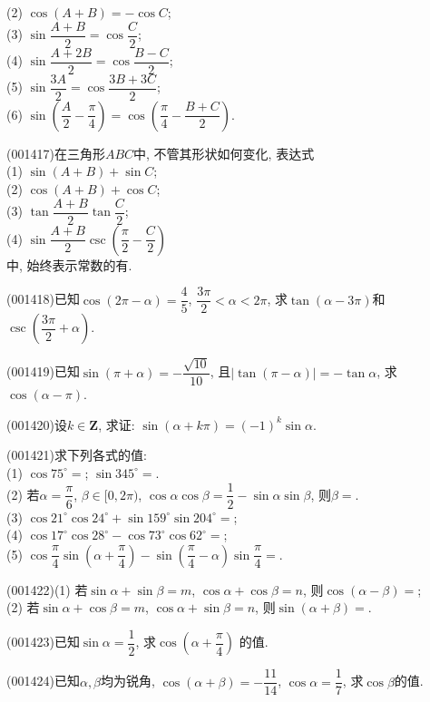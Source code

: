 (2) $\cos(A+B)=-\cos C$;\\ 
(3) $\sin\dfrac{A+B}{2}=\cos\dfrac{C}{2}$;\\ 
(4) $\sin\dfrac{A+2B}{2}=\cos\dfrac{B-C}{2}$;\\ 
(5) $\sin\dfrac{3A}{2}=\cos\dfrac{3B+3C}{2}$;\\ 
(6) $\sin\left(\dfrac{A}{2}-\dfrac{\pi}{4}\right)=\cos\left(\dfrac{\pi}4-\dfrac{B+C}{2}\right)$.
\item (001417)在三角形$ABC$中, 不管其形状如何变化, 表达式\\ 
(1) $\sin(A+B)+\sin C$;\\ 
(2) $\cos(A+B)+\cos C$;\\ 
(3) $\tan\dfrac{A+B}{2}\tan\dfrac{C}{2}$;\\ 
(4) $\sin\dfrac{A+B}{2}\csc\left(\dfrac{\pi}{2}-\dfrac{C}{2}\right)$\\ 
中, 始终表示常数的有.
\item (001418)已知$\cos(2\pi-\alpha)=\dfrac{4}{5}$, $\dfrac{3\pi}{2}<\alpha<2\pi$, 求$\tan(\alpha-3\pi)$和$\csc\left(\dfrac{3\pi}{2}+\alpha\right)$.
\item (001419)已知$\sin(\pi+\alpha)=-\dfrac{\sqrt{10}}{10}$, 且$|\tan(\pi-\alpha)|=-\tan\alpha$, 求$\cos(\alpha-\pi)$.
\item (001420)设$k\in\mathbf{Z}$, 求证: $\sin(\alpha+k\pi)=(-1)^k\sin\alpha$.
\item (001421)求下列各式的值:\\ 
(1) $\cos 75^\circ=$; $\sin 345^\circ=$.\\ 
(2) 若$\alpha=\dfrac{\pi}{6}$, $\beta\in [0,2\pi)$, $\cos\alpha\cos\beta=\dfrac{1}{2}-\sin\alpha\sin\beta$, 则$\beta=$.\\ 
(3) $\cos 21^\circ\cos 24^\circ+\sin 159^\circ\sin 204^\circ=$;\\ 
(4) $\cos 17^\circ\cos 28^\circ-\cos 73^\circ\cos 62^\circ=$;\\ 
(5) $\cos\dfrac{\pi}{4}\sin(\alpha+\dfrac{\pi}{4})-\sin(\dfrac{\pi}{4}-\alpha)\sin\dfrac{\pi}{4}=$.
\item (001422)(1) 若$\sin\alpha+\sin\beta=m$, $\cos\alpha+\cos\beta=n$, 则$\cos(\alpha-\beta)=$;\\ 
(2) 若$\sin\alpha+\cos\beta=m$, $\cos\alpha+\sin\beta=n$, 则$\sin(\alpha+\beta)=$.
\item (001423)已知$\sin\alpha=\dfrac{1}{2}$, 求$\cos(\alpha+\dfrac{\pi}{4})$ 的值.
\item (001424)已知$\alpha,\beta$均为锐角, $\cos(\alpha+\beta)=-\dfrac{11}{14}$, $\cos \alpha=\dfrac{1}{7}$, 求$\cos\beta$的值.
